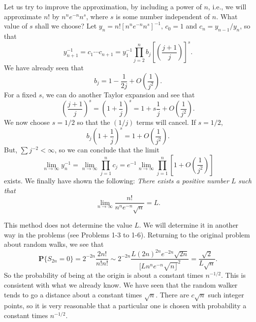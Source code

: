 \documentclass{stml-l}
\theoremstyle{definition}
\numberwithin{equation}{chapter}
\numberwithin{figure}{chapter}
\numberwithin{figure}{section}
\begin{document}
Let us try to improve the approximation, by including a power of
$n$, i.e., we will approximate $n!$ by $n^{n}e^{-n}n^{s}$, where $s$
is some number independent of $n$. What value of $s$ shall we
choose? Let $y_{n}=n![n^{n}e^{-n}n^{s}]^{-1},\,c_{0}=1$ and
$c_{n}=y_{n-1}/y_{n}$, so that
\begin{equation*}
y_{n+1}^{-1}=c_{1}\cdots
c_{n+1}=y_{1}^{-1}\prod\limits_{j=2}^{n}b_{j}\left[\left(\frac{j+1}{j}\right)\right]^{s}.
\end{equation*}
We have already seen that
\begin{equation*}
b_{j}=1-\frac{1}{2j}+O\left(\frac{1}{j^{2}}\right).
\end{equation*}
For a fixed $s$, we can do another Taylor expansion and see that
\begin{equation*}
\left(\frac{j+1}{j}\right)^{s}=\left(1+\frac{1}{j}\right)^{s}=1+s\frac{1}{j}+O\left(\frac{1}{j^{2}}\right).
\end{equation*}
We now choose $s=1/2$ so that the $(1/j)$ terms will cancel. If $s=1/2$,
\begin{equation*}
b_{j}\left(1+\frac{1}{j}\right)^{s}=1+O\left(\frac{1}{j^{2}}\right).
\end{equation*}
But, $\sum j^{-2}<\infty$, so we can conclude that the limit
\begin{equation*}
\lim_{n\rightarrow\infty}y_{n}^{-1}=\lim_{n\rightarrow\infty}\prod\limits_{j=1}^{n}c_{j}=e^{-1}\lim_{n\rightarrow\infty}\prod\limits_{j=1}^{n}\left[1+O\left(\frac{1}{j^{2}}\right)\right]
\end{equation*}
exists. We finally have shown the following: \emph{There exists a positive number} $L$ \emph{such that}
\begin{equation*}
\lim_{n\rightarrow\infty}\frac{n!}{n^{n}e^{-n}\sqrt{n}}=L.
\end{equation*}

This method does not determine the value $L$. We will determine it
in another way in the problems (see Problems 1-3 to 1-6). Returning
to the original problem about random walks, we see that
\begin{equation*}
\mathbf{P}\{S_{2n}=0\}=2^{-2n}\frac{2n!}{n!n!}\sim
2^{-2n}\frac{L(2n)^{2n}e^{-2n}\sqrt{2n}}{[Ln^{n}e^{-n}\sqrt{n\rfloor}^{2}}=\frac{\sqrt{2}}{L\sqrt{n}}.
\end{equation*}
So the probability of being at the origin is about a constant times
$n^{-1/2}$. This is consistent with what we already know. We have
seen that the random walker tends to go a distance about a constant
times $\sqrt{n}$. There are $c\sqrt{n}$ such integer points, so it
is very reasonable that a particular one is chosen with probability
a constant times $n^{-1/2}$.
\end{document}
